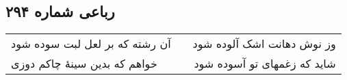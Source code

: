 \begin{center}
\section*{رباعی شماره ۲۹۴}
\label{sec:sh294}
\begin{longtable}{l p{0.5cm} r}
آن رشته که بر لعل لبت سوده شود
&&
وز نوش دهانت اشک آلوده شود
\\
خواهم که بدین سینهٔ چاکم دوزی
&&
شاید که زغمهای تو آسوده شود
\\
\end{longtable}
\end{center}

